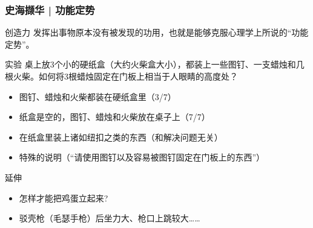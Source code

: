
\begin{frame}
  \frametitle{史海撷华 | 功能定势}
  \begin{block}{创造力}
    发挥出事物原本没有被发现的功用，也就是能够克服心理学上所说的“功能定势”。
  \end{block}
  \vspace{-0.5em}
  \pause
  \begin{block}{实验}
    桌上放3个小的硬纸盒（大约火柴盒大小），都装上一些图钉、一支蜡烛和几根火柴。如何将3根蜡烛固定在门板上相当于人眼睛的高度处？
    \pause
    \pause
    \pause
    \begin{itemize}
      \item 图钉、蜡烛和火柴都装在硬纸盒里（3/7）
      \item 纸盒是空的，图钉、蜡烛和火柴放在桌子上（7/7）
      \item 在纸盒里装上诸如纽扣之类的东西（和解决问题无关）
      \item 特殊的说明（“请使用图钉以及容易被图钉固定在门板上的东西”）
    \end{itemize}
  \end{block}
  \vspace{-0.5em}
  \pause
  \begin{block}{延伸}
    \begin{itemize}
      \item 怎样才能把鸡蛋立起来?
      \item 驳壳枪（毛瑟手枪）后坐力大、枪口上跳较大……
    \end{itemize}
  \end{block}
\end{frame}

